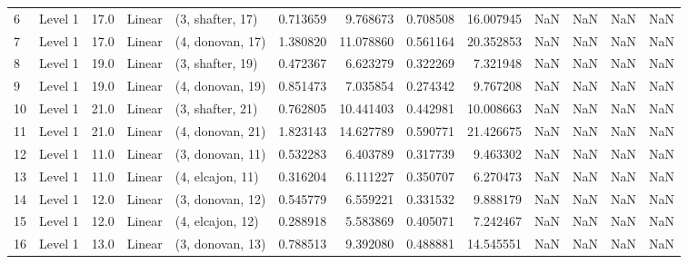 \begin{tabular}{llrllrrrrrrrr}
6  &   Level 1 &   17.0 &      Linear &  (3, shafter, 17) &   0.713659 &   9.768673 &  0.708508 &  16.007945 &                  NaN &                    NaN &                 NaN &                   NaN \\
7  &   Level 1 &   17.0 &      Linear &  (4, donovan, 17) &   1.380820 &  11.078860 &  0.561164 &  20.352853 &                  NaN &                    NaN &                 NaN &                   NaN \\
8  &   Level 1 &   19.0 &      Linear &  (3, shafter, 19) &   0.472367 &   6.623279 &  0.322269 &   7.321948 &                  NaN &                    NaN &                 NaN &                   NaN \\
9  &   Level 1 &   19.0 &      Linear &  (4, donovan, 19) &   0.851473 &   7.035854 &  0.274342 &   9.767208 &                  NaN &                    NaN &                 NaN &                   NaN \\
10 &   Level 1 &   21.0 &      Linear &  (3, shafter, 21) &   0.762805 &  10.441403 &  0.442981 &  10.008663 &                  NaN &                    NaN &                 NaN &                   NaN \\
11 &   Level 1 &   21.0 &      Linear &  (4, donovan, 21) &   1.823143 &  14.627789 &  0.590771 &  21.426675 &                  NaN &                    NaN &                 NaN &                   NaN \\
12 &   Level 1 &   11.0 &      Linear &  (3, donovan, 11) &   0.532283 &   6.403789 &  0.317739 &   9.463302 &                  NaN &                    NaN &                 NaN &                   NaN \\
13 &   Level 1 &   11.0 &      Linear &  (4, elcajon, 11) &   0.316204 &   6.111227 &  0.350707 &   6.270473 &                  NaN &                    NaN &                 NaN &                   NaN \\
14 &   Level 1 &   12.0 &      Linear &  (3, donovan, 12) &   0.545779 &   6.559221 &  0.331532 &   9.888179 &                  NaN &                    NaN &                 NaN &                   NaN \\
15 &   Level 1 &   12.0 &      Linear &  (4, elcajon, 12) &   0.288918 &   5.583869 &  0.405071 &   7.242467 &                  NaN &                    NaN &                 NaN &                   NaN \\
16 &   Level 1 &   13.0 &      Linear &  (3, donovan, 13) &   0.788513 &   9.392080 &  0.488881 &  14.545551 &                  NaN &                    NaN &                 NaN &                   NaN \\

\end{tabular}
